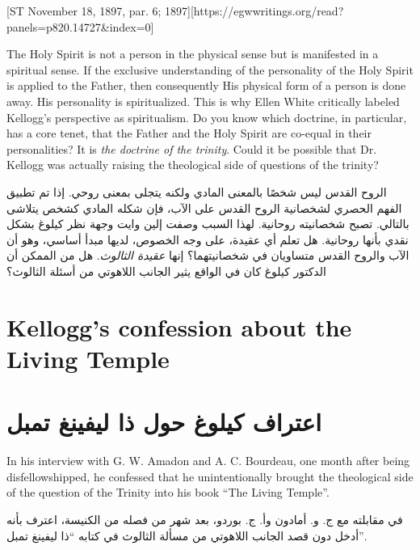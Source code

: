 [ST November 18, 1897, par. 6; 1897][https://egwwritings.org/read?panels=p820.14727&index=0]


The Holy Spirit is not a person in the physical sense but is manifested in a spiritual sense. If the exclusive understanding of the personality of the Holy Spirit is applied to the Father, then consequently His physical form of a person is done away. His personality is spiritualized. This is why Ellen White critically labeled Kellogg's perspective as spiritualism. Do you know which doctrine, in particular, has a core tenet, that the Father and the Holy Spirit are co-equal in their personalities? It is \textit{the doctrine of the trinity}. Could it be possible that Dr. Kellogg was actually raising the theological side of questions of the trinity?


الروح القدس ليس شخصًا بالمعنى المادي ولكنه يتجلى بمعنى روحي. إذا تم تطبيق الفهم الحصري لشخصانية الروح القدس على الآب، فإن شكله المادي كشخص يتلاشى بالتالي. تصبح شخصانيته روحانية. لهذا السبب وصفت إلين وايت وجهة نظر كيلوغ بشكل نقدي بأنها روحانية. هل تعلم أي عقيدة، على وجه الخصوص، لديها مبدأ أساسي، وهو أن الآب والروح القدس متساويان في شخصانيتهما؟ إنها \textit{عقيدة الثالوث}. هل من الممكن أن الدكتور كيلوغ كان في الواقع يثير الجانب اللاهوتي من أسئلة الثالوث؟


\section*{Kellogg’s confession about the Living Temple}


\section*{اعتراف كيلوغ حول ذا ليفينغ تمبل}


In his interview with G. W. Amadon and A. C. Bourdeau, one month after being disfellowshipped, he confessed that he unintentionally brought the theological side of the question of the Trinity into his book “The Living Temple”.


في مقابلته مع ج. و. أمادون وأ. ج. بوردو، بعد شهر من فصله من الكنيسة، اعترف بأنه أدخل دون قصد الجانب اللاهوتي من مسألة الثالوث في كتابه “ذا ليفينغ تمبل”.


